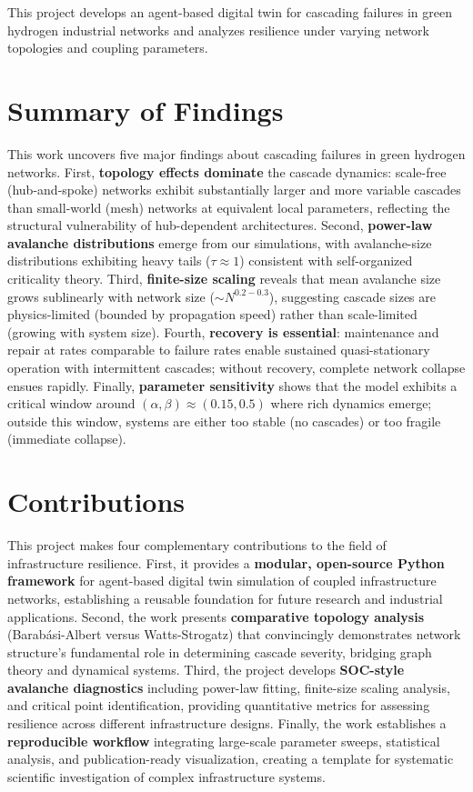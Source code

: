 \documentclass[12pt,a4paper,twoside]{report}
\begin{document}
This project develops an agent-based digital twin for cascading failures in green hydrogen industrial networks and analyzes resilience under varying network topologies and coupling parameters.

\section{Summary of Findings}

This work uncovers five major findings about cascading failures in green hydrogen networks. First, \textbf{topology effects dominate} the cascade dynamics: scale-free (hub-and-spoke) networks exhibit substantially larger and more variable cascades than small-world (mesh) networks at equivalent local parameters, reflecting the structural vulnerability of hub-dependent architectures. Second, \textbf{power-law avalanche distributions} emerge from our simulations, with avalanche-size distributions exhibiting heavy tails ($\tau \approx 1$) consistent with self-organized criticality theory. Third, \textbf{finite-size scaling} reveals that mean avalanche size grows sublinearly with network size ($\sim N^{0.2-0.3}$), suggesting cascade sizes are physics-limited (bounded by propagation speed) rather than scale-limited (growing with system size). Fourth, \textbf{recovery is essential}: maintenance and repair at rates comparable to failure rates enable sustained quasi-stationary operation with intermittent cascades; without recovery, complete network collapse ensues rapidly. Finally, \textbf{parameter sensitivity} shows that the model exhibits a critical window around $(\alpha, \beta) \approx (0.15, 0.5)$ where rich dynamics emerge; outside this window, systems are either too stable (no cascades) or too fragile (immediate collapse).

\section{Contributions}

This project makes four complementary contributions to the field of infrastructure resilience. First, it provides a \textbf{modular, open-source Python framework} for agent-based digital twin simulation of coupled infrastructure networks, establishing a reusable foundation for future research and industrial applications. Second, the work presents \textbf{comparative topology analysis} (Barabási-Albert versus Watts-Strogatz) that convincingly demonstrates network structure's fundamental role in determining cascade severity, bridging graph theory and dynamical systems. Third, the project develops \textbf{SOC-style avalanche diagnostics} including power-law fitting, finite-size scaling analysis, and critical point identification, providing quantitative metrics for assessing resilience across different infrastructure designs. Finally, the work establishes a \textbf{reproducible workflow} integrating large-scale parameter sweeps, statistical analysis, and publication-ready visualization, creating a template for systematic scientific investigation of complex infrastructure systems.
\end{document}
